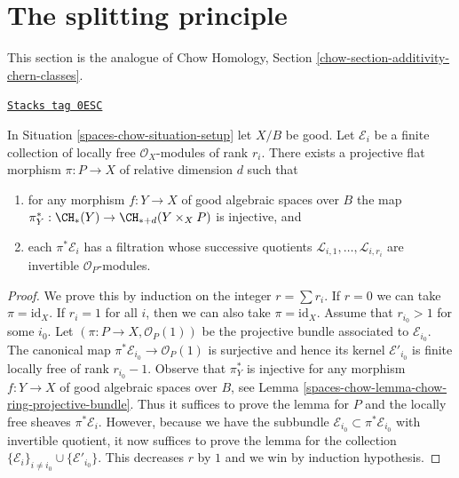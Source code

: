 \section{The splitting principle}
\label{spaces-chow-section-splitting-principle}
This section is the analogue of Chow Homology, Section
\ref{chow-section-additivity-chern-classes}.

\begin{lemma}
\label{spaces-chow-lemma-splitting-principle}
\href{https://stacks.math.columbia.edu/tag/0ESC}{\texttt{Stacks tag 0ESC}}

In Situation \ref{spaces-chow-situation-setup} let $X/B$ be good.
Let $\mathcal{E}_i$ be a finite collection of locally free
$\mathcal{O}_X$-modules of rank $r_i$. There exists a projective
flat morphism $\pi : P \to X$ of relative dimension $d$ such that
\begin{enumerate}
\item for any morphism $f : Y \to X$ of good algebraic spaces
over $B$ the map
$\pi_Y^* : \CH_*(Y) \to \CH_{* + d}(Y \times_X P)$ is injective, and
\item each $\pi^*\mathcal{E}_i$ has a filtration
whose successive quotients $\mathcal{L}_{i, 1}, \ldots, \mathcal{L}_{i, r_i}$
are invertible ${\mathcal O}_P$-modules.
\end{enumerate}
\end{lemma}

\begin{proof}
We prove this by induction on the integer $r = \sum r_i$.
If $r = 0$ we can take $\pi = \text{id}_X$.
If $r_i = 1$ for all $i$, then we can also take $\pi = \text{id}_X$.
Assume that $r_{i_0} > 1$ for some $i_0$.
Let $(\pi : P \to X, \mathcal{O}_P(1))$
be the projective bundle associated to $\mathcal{E}_{i_0}$.
The canonical map $\pi^*\mathcal{E}_{i_0} \to \mathcal{O}_P(1)$
is surjective and hence its kernel $\mathcal{E}'_{i_0}$
is finite locally free of rank $r_{i_0} - 1$.
Observe that $\pi_Y^*$ is injective for any
morphism $f : Y \to X$ of good algebraic spaces
over $B$, see Lemma \ref{spaces-chow-lemma-chow-ring-projective-bundle}.
Thus it suffices to prove the lemma for
$P$ and the locally free sheaves $\pi^*\mathcal{E}_i$.
However, because we have the subbundle
$\mathcal{E}_{i_0} \subset \pi^*\mathcal{E}_{i_0}$
with invertible quotient, it now suffices to prove
the lemma for the collection
$\{\mathcal{E}_i\}_{i \not = i_0} \cup \{\mathcal{E}'_{i_0}\}$.
This decreases $r$ by $1$ and we win by induction hypothesis.
\end{proof}

